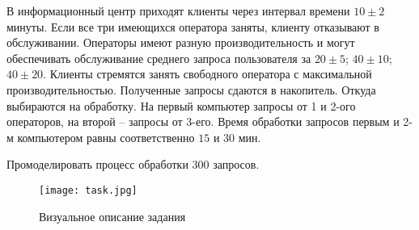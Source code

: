 В информационный центр приходят клиенты через интервал времени $10\pm2$ минуты. Если все три имеющихся оператора заняты, клиенту отказывают в обслуживании. Операторы имеют разную производительность и могут обеспечивать обслуживание среднего запроса пользователя за $20\pm5$; $40\pm10$; $40\pm20$. Клиенты стремятся занять свободного оператора с максимальной производительностью. Полученные запросы сдаются в накопитель. Откуда выбираются на обработку. На первый компьютер запросы от 1 и 2-ого операторов, на второй – запросы от 3-его. Время обработки запросов первым и 2-м компьютером равны соответственно $15$ и $30$ мин.

Промоделировать процесс обработки 300 запросов.

\begin{figure}[h]
	\begin{center}
		{\texttt{[image: task.jpg]}
			\caption{Визуальное описание задания}
			\label{pic:1}}
	\end{center}
\end{figure}